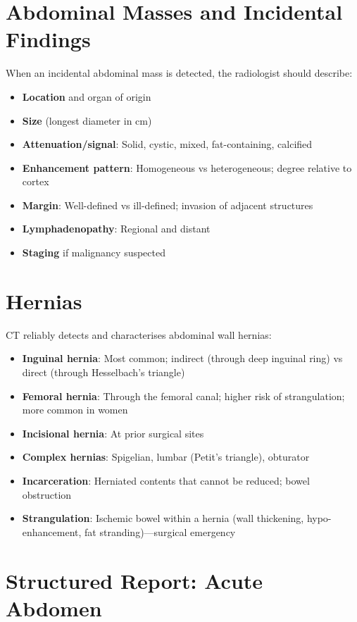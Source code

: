 \section{Abdominal Masses and Incidental Findings}
When an incidental abdominal mass is detected, the radiologist should describe:
\begin{itemize}
  \item \textbf{Location} and organ of origin
  \item \textbf{Size} (longest diameter in cm)
  \item \textbf{Attenuation/signal}: Solid, cystic, mixed, fat-containing, calcified
  \item \textbf{Enhancement pattern}: Homogeneous vs heterogeneous; degree relative to cortex
  \item \textbf{Margin}: Well-defined vs ill-defined; invasion of adjacent structures
  \item \textbf{Lymphadenopathy}: Regional and distant
  \item \textbf{Staging} if malignancy suspected
\end{itemize}


\section{Hernias}
CT reliably detects and characterises abdominal wall hernias:
\begin{itemize}
  \item \textbf{Inguinal hernia}: Most common; indirect (through deep inguinal ring) vs direct (through Hesselbach's triangle)
  \item \textbf{Femoral hernia}: Through the femoral canal; higher risk of strangulation; more common in women
  \item \textbf{Incisional hernia}: At prior surgical sites
  \item \textbf{Complex hernias}: Spigelian, lumbar (Petit's triangle), obturator
  \item \textbf{Incarceration}: Herniated contents that cannot be reduced; bowel obstruction
  \item \textbf{Strangulation}: Ischemic bowel within a hernia (wall thickening, hypo-enhancement, fat stranding)---surgical emergency
\end{itemize}


\section{Structured Report: Acute Abdomen}

